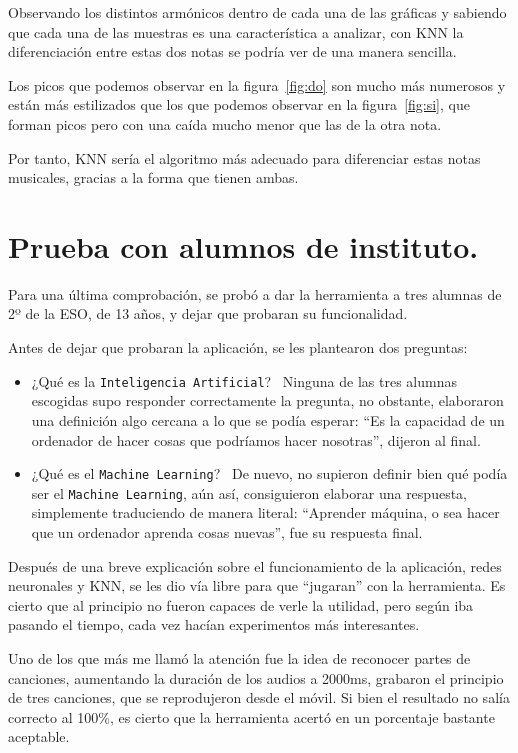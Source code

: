 \documentclass[a4paper, 12pt]{book}
\begin{document}
Observando los distintos armónicos dentro de cada una de las gráficas y sabiendo que cada una de las muestras es una característica a analizar, con KNN la diferenciación entre estas dos notas se podría ver de una manera sencilla.

Los picos que podemos observar en la figura~\ref{fig:do} son mucho más numerosos y están más estilizados que los que podemos observar en la figura~\ref{fig:si}, que forman picos pero con una caída mucho menor que las de la otra nota.

Por tanto, KNN sería el algoritmo más adecuado para diferenciar estas notas musicales, gracias a la forma que tienen ambas.

\section{Prueba con alumnos de instituto.}
\label{sec:prueba}

Para una última comprobación, se probó a dar la herramienta a tres alumnas de 2º de la ESO, de 13 años, y dejar que probaran su funcionalidad.

Antes de dejar que probaran la aplicación, se les plantearon dos preguntas:

\begin{itemize}
	\item ¿Qué es la \texttt{Inteligencia Artificial}?~ Ninguna de las tres alumnas escogidas supo responder correctamente la pregunta, no obstante, elaboraron una definición algo cercana a lo que se podía esperar: ``Es la capacidad de un ordenador de hacer cosas que podríamos hacer nosotras'', dijeron al final.
	\item ¿Qué es el \texttt{Machine Learning}?~ De nuevo, no supieron definir bien qué podía ser el \texttt{Machine Learning}, aún así, consiguieron elaborar una respuesta, simplemente traduciendo de manera literal: ``Aprender máquina, o sea hacer que un ordenador aprenda cosas nuevas'', fue su respuesta final.
\end{itemize}

Después de una breve explicación sobre el funcionamiento de la aplicación, redes neuronales y KNN, se les dio vía libre para que ``jugaran'' con la herramienta. Es cierto que al principio no fueron capaces de verle la utilidad, pero según iba pasando el tiempo, cada vez hacían experimentos más interesantes.

Uno de los que más me llamó la atención fue la idea de reconocer partes de canciones, aumentando la duración de los audios a 2000ms, grabaron el principio de tres canciones, que se reprodujeron desde el móvil. Si bien el resultado no salía correcto al 100\%, es cierto que la herramienta acertó en un porcentaje bastante aceptable.
\end{document}
